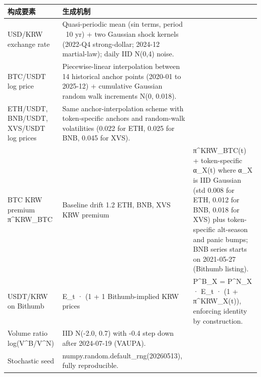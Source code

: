 \begin{tabular}{p{4.5cm}p{10.5cm}}
\toprule
构成要素 & 生成机制 \\
\midrule
USD/KRW exchange rate & Quasi-periodic mean (sin terms, period ~10 yr) + two Gaussian shock kernels (2022-Q4 strong-dollar; 2024-12 martial-law); daily IID N(0,4) noise. \\
BTC/USDT log price & Piecewise-linear interpolation between 14 historical anchor points (2020-01 to 2025-12) + cumulative Gaussian random walk increments N(0, 0.018). \\
ETH/USDT, BNB/USDT, XVS/USDT log prices & Same anchor-interpolation scheme with token-specific anchors and random-walk volatilities (0.022 for ETH, 0.025 for BNB, 0.045 for XVS). \\
BTC KRW premium π^KRW_BTC & Baseline drift 1.2%
ETH, BNB, XVS KRW premium & π^KRW_BTC(t) + token-specific α_X(t) where α_X is IID Gaussian (std 0.008 for ETH, 0.012 for BNB, 0.018 for XVS) plus token-specific alt-season and panic bumps; BNB series starts on 2021-05-27 (Bithumb listing). \\
USDT/KRW on Bithumb & E_t · (1 + 1%
Bithumb-implied KRW prices & P^B_X = P^N_X · E_t · (1 + π^KRW_X(t)), enforcing identity by construction. \\
Volume ratio log(V^B/V^N) & IID N(-2.0, 0.7) with -0.4 step down after 2024-07-19 (VAUPA). \\
Stochastic seed & numpy.random.default_rng(20260513), fully reproducible. \\
\bottomrule
\end{tabular}